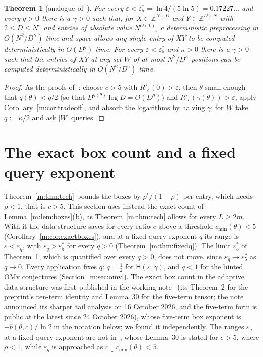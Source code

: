 \documentclass[11pt]{article}
\newtheorem{theorem}{Theorem}[section]
\theoremstyle{definition}
\theoremstyle{remark}
\newcommand{\Z}{\mathbb{Z}}
\newcommand{\es}{\varepsilon^*_5}
\newcommand{\Hyp}{\mathsf{H}}
\begin{document}
\begin{theorem}[analogue of~{\cite[Theorems 24 and 25]{ZT}}]\label{m:thm:general}
For every $\varepsilon<\es=\ln4/(5\ln5)=0.17227\ldots$ and every $q>0$ there is a $\gamma>0$ such that, for $X\in\Z^{N\times D}$ and $Y\in\Z^{D\times N}$ with $2\le D\le N^\varepsilon$ and entries of absolute value $N^{O(1)}$, a deterministic preprocessing in $O(N^2/D^\gamma)$ time and space allows any single entry of $XY$ to be computed deterministically in $O(D^q)$ time. For every $\varepsilon<\es$ and $\kappa>0$ there is a $\gamma>0$ such that the entries of $XY$ at any set $W$ of at most $N^2/D^{\kappa}$ positions can be computed deterministically in $O(N^2/D^\gamma)$ time.
\end{theorem}

\begin{proof}
As the proofs of~\cite[Theorems 24 and 25]{ZT}: choose $c>5$ with $R'_c(0)>\varepsilon$, then $\theta$ small enough that $q(\theta)<q/2$ (so that $D^{q(\theta)}\log D=O(D^q)$) and $R'_c(\gamma(\theta))>\varepsilon$, apply Corollary~\ref{m:cor:tradeoff}, and absorb the logarithms by halving $\gamma$; for $W$ take $q:=\kappa/2$ and ask $|W|$ queries.
\end{proof}

\section{The exact box count and a fixed query exponent}\label{m:sec:fixedq}

Theorem~\ref{m:thm:tech} bounds the boxes by $\rho^t/(1-\rho)$ per entry, which needs $\rho<1$, that is $c>5$. This section uses instead the exact count of Lemma~\ref{m:lem:boxes}(b), as Theorem~\ref{m:thm:tech} allows for every $L\ge2m$. With it the data structure saves for every ratio $c$ above a threshold $c_{\min}(\theta)<5$ (Corollary~\ref{m:cor:exactboxes}), and at a fixed query exponent $q$ its range is $\varepsilon<\varepsilon_q$, with $\varepsilon_q>\es$ for every $q>0$ (Theorem~\ref{m:thm:fixedq}). The limit $\es$ of Theorem~\ref{m:thm:general}, which is quantified over every $q>0$, does not move, since $\varepsilon_q\to\es$ as $q\to0$. Every application fixes $q$: $q=\frac12$ for $\Hyp(\varepsilon,\gamma)$, and $q<1$ for the hinted OMv conjectures (Section~\ref{m:sec:omv}).
The exact box count in the adaptive data structure was first published in the working note~\cite{Shr26} (its Theorem~2 for the preprint's ten-term identity and Lemma~30 for the five-term tensor; the note announced its sharper tail analysis on 16 October 2026, and the five-term form is public at the latest since 24 October 2026), whose five-term box exponent is $-b(\theta,c)/\ln2$ in the notation below; we found it independently.
The ranges $\varepsilon_q$ at a fixed query exponent are not in~\cite{Shr26}, whose Lemma~30 is stated for $c>5$, where $\rho<1$, while $\varepsilon_q$ is approached as $c\downarrow c_{\min}(\theta)<5$.
\end{document}
